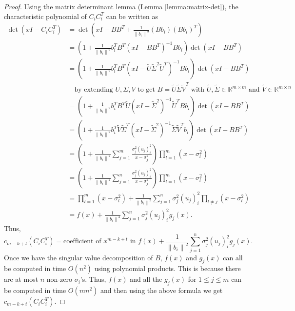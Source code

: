\documentclass[11pt]{article}
\def\reals{\mathbb{R}}
\newcommand{\deter}[1]{\operatorname{det}\left(#1\right)}
\newcommand{\norm}[1]{\left\|#1\right\|}
\begin{document}
\begin{proof}
Using the matrix determinant lemma (Lemma \ref{lemma:matrix-det}), the characteristic polynomial of $C_{i} C_{i}^{T}$ can be written as
\begin{align*}
\deter{xI - C_{i} C_{i}^{T}} & = \deter{xI - BB^{T} + \frac{1}{\norm{b_{i}}^{2}} (Bb_{i})(Bb_{i})^{T}} \\
& = \left(1 + \frac{1}{\norm{b_{i}}^{2}} b_{i}^{T} B^{T} (xI - BB^{T})^{-1} Bb_{i}\right) \deter{xI - BB^{T}} \\
& = \left(1 + \frac{1}{\norm{b_{i}}^{2}} b_{i}^{T} B^{T} (xI - \tilde{U}\tilde{\Sigma}^{2}\tilde{U}^{T})^{-1} Bb_{i}\right) \deter{xI - BB^{T}} \\
& \quad \text{by extending $U, \Sigma, V$ to get $B = \tilde{U} \tilde{\Sigma} \tilde{V}^{T}$ with $\tilde{U}, \tilde{\Sigma} \in \reals^{m \times m}$ and $\tilde{V} \in \reals^{m \times n}$} \\
& = \left(1 + \frac{1}{\norm{b_{i}}^{2}} b_{i}^{T} B^{T}\tilde{U} (xI - \tilde{\Sigma}^{2})^{-1} \tilde{U}^{T}B b_{i}\right) \deter{xI - BB^{T}} \\
& = \left(1 + \frac{1}{\norm{b_{i}}^{2}} b_{i}^{T} \tilde{V}\tilde{\Sigma}^{T} (xI - \tilde{\Sigma}^{2})^{-1} \tilde{\Sigma} \tilde{V}^{T}b_{i}\right) \deter{xI - BB^{T}} \\
& = \left(1 + \frac{1}{\norm{b_{i}}^{2}} \sum_{j=1}^{m} \frac{\sigma_{j}^{2} (\tilde{u}_{j})_{i}^{2}}{x - \sigma_{j}^{2}}\right) \prod_{l=1}^{m} (x - \sigma_{l}^{2}) \\
& = \left(1 + \frac{1}{\norm{b_{i}}^{2}} \sum_{j=1}^{n} \frac{\sigma_{j}^{2} (u_{j})_{i}^{2}}{x - \sigma_{j}^{2}}\right) \prod_{l=1}^{m} (x - \sigma_{l}^{2}) \\
& = \prod_{l=1}^{m} (x - \sigma_{l}^{2}) + \frac{1}{\norm{b_{i}}^{2}} \sum_{j=1}^{n} \sigma_{j}^{2} (u_{j})_{i}^{2} \prod_{l \neq j} (x - \sigma_{l}^{2}) \\
& = f(x) + \frac{1}{\norm{b_{i}}^{2}} \sum_{j=1}^{n} \sigma_{j}^{2} (u_{j})_{i}^{2} g_{j}(x).
\end{align*}
Thus,
\[
c_{m-k+t} (C_{i} C_{i}^{T}) = \text{coefficient of $x^{m-k+t}$ in $f(x) + \dfrac{1}{\norm{b_{i}}^{2}} \sum_{j=1}^{n} \sigma_{j}^{2} (u_{j})_{i}^{2} g_{j}(x)$}.
\]
Once we have the singular value decomposition of $B$, $f(x)$ and $g_{j}(x)$ can all be computed in time $O(n^{2})$ using polynomial products. This is because there are at most $n$ non-zero $\sigma_{i}$'s. Thus, $f(x)$ and all the $g_{j}(x)$ for $1 \leq j \leq m$ can be computed in time $O(mn^{2})$ and then using the above formula we get $c_{m-k+t} (C_{i} C_{i}^{T})$.
\end{proof}
\end{document}
